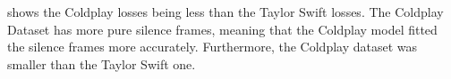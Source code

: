  shows the Coldplay losses being less than the Taylor Swift losses. The Coldplay Dataset has more pure silence frames, meaning that the Coldplay model fitted the silence frames more accurately. Furthermore, the Coldplay dataset was smaller than the Taylor Swift one.
